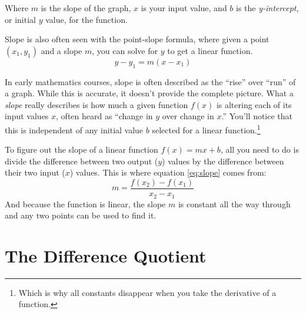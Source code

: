 Where $m$ is the slope of the graph, $x$ is your input value, and $b$ is the \emph{y-intercept}, or initial $y$ value, for the function.

Slope is also often seen with the point-slope formula, where given a point $(x_1, y_1)$ and a slope $m$, you can solve for $y$ to get a linear function.
\begin{equation}
  \label{eq:pointslope}
  y-y_1=m(x-x_1)
\end{equation}

In early mathematics courses, slope is often described as the ``rise'' over ``run'' of a graph.
While this is accurate, it doesn't provide the complete picture.
What a \emph{slope} really describes is how much a given function $f(x)$ is altering each of its input values $x$, often heard as ``change in $y$ over change in $x$.''
You'll notice that this is independent of any initial value $b$ selected for a linear function.\footnote{Which is why all constants disappear when you take the derivative of a function.}

To figure out the slope of a linear function $f(x)=mx+b$, all you need to do is
divide the difference between two output ($y$) values by the difference between
their two input ($x$) values. This is where equation \eqref{eq:slope} comes from:
\begin{equation*}
  m=\frac{f(x_2)-f(x_1)}{x_2-x_1}
\end{equation*}
And because the function is linear, the slope $m$ is constant all the way through and any two points can be used to find it.

\section{The Difference Quotient}

